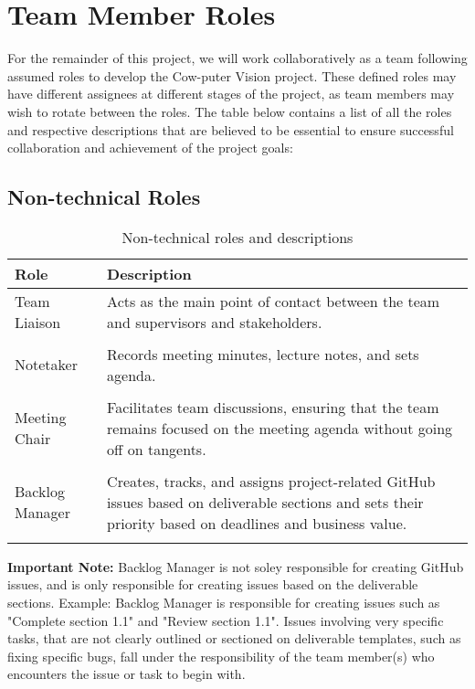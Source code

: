 \documentclass{article}
\begin{document}
\section{Team Member Roles}

For the remainder of this project, we will work collaboratively as a team following assumed roles to develop the Cow-puter Vision project. These defined roles may have different assignees at different stages of the project, as team members may wish to rotate between the roles.
The table below contains a list of all the roles and respective descriptions that are believed to be essential to ensure successful collaboration and achievement of the project goals:

\subsection{Non-technical Roles}
\begin{table}[ht]
\centering
\caption{Non-technical roles and descriptions}
\label{tab:non-technical-roles}
\begin{tabularx}{\textwidth}{lX}
\toprule
\textbf{Role} & \textbf{Description} \\
\midrule

Team Liaison & Acts as the main point of contact between the team and supervisors and stakeholders.  \\ \\
Notetaker & Records meeting minutes, lecture notes, and sets agenda. \\ \\
Meeting Chair & Facilitates team discussions, ensuring that the team remains focused on the meeting agenda without going off on tangents. \\ \\
Backlog Manager & Creates, tracks, and assigns project-related GitHub issues based on deliverable sections and sets their priority based on deadlines and business value.\\ \\
\bottomrule
\end{tabularx}
\end{table}

\noindent\textbf{Important Note:} Backlog Manager is not soley responsible for creating GitHub issues, and is only responsible for creating issues based on the deliverable sections. Example: Backlog
Manager is responsible for creating issues such as "Complete section 1.1" and "Review section 1.1". Issues involving very specific tasks, 
that are not clearly outlined or sectioned on deliverable templates, such as fixing specific bugs, fall under the responsibility of 
the team member(s) who encounters the issue or task to begin with.\\
\end{document}
